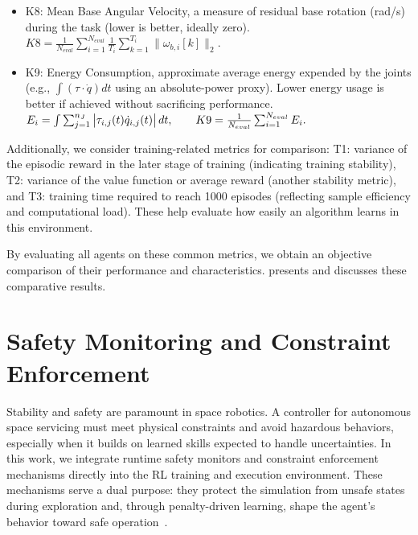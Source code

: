 \documentclass{ieeeaccess}
\begin{document}
\begin{itemize}
  \item K8: Mean Base Angular Velocity, a measure of residual base rotation (rad/s) during the task (lower is better, ideally zero).\\
  $K8=\frac{1}{N_{eval}}\sum_{i=1}^{N_{eval}}\frac{1}{T_i}\sum_{k=1}^{T_i}\|\omega_{b,i}[k]\|_2.$

  \item K9: Energy Consumption, approximate average energy expended by the joints (e.g., $\int(\tau \cdot \dot q) dt$ using an absolute-power proxy). Lower energy usage 
  is better if achieved without sacrificing performance.\\
  $E_i=\int\sum_{j=1}^{n_J}\big|\tau_{i,j}(t)\dot q_{i,j}(t)\big|\,dt, \\\qquad
  K9=\frac{1}{N_{eval}}\sum_{i=1}^{N_{eval}} E_i.$
\end{itemize}


\noindent
Additionally, we consider training-related metrics for comparison: T1: variance of the episodic reward
in the later stage of training (indicating training stability), T2: variance of the value function or
average reward (another stability metric), and T3: training time required to reach 1000 episodes
(reflecting sample efficiency and computational load). These help evaluate how easily an
algorithm learns in this environment.
 
By evaluating all agents on these common metrics, we obtain an objective comparison of their
performance and characteristics.  presents and discusses these comparative results.

\section{Safety Monitoring and Constraint Enforcement}\label{formal}
Stability and safety are paramount in space robotics. A controller for autonomous space servicing must meet physical constraints and avoid hazardous behaviors, especially 
when it builds on learned skills expected to handle uncertainties. In this work, we integrate runtime safety monitors and constraint enforcement mechanisms directly into the 
RL training and execution environment. These mechanisms serve a dual purpose: they protect the simulation from unsafe states during exploration and, through penalty-driven 
learning, shape the agent's behavior toward safe operation~\cite{b7,b22}.
\end{document}
